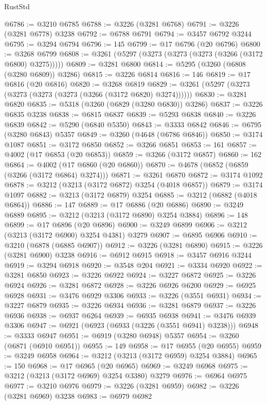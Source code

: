 \begin{lexlean}{RustStd}
\begin{coremodule}
{\begin{coremodule}
{{{{{{{{{{{{{{{{{{{{{{{{{{@6786 := @3210 @6785
@6788 := @3226 (@3281 @6768)
@6791 := @3226 (@3281 @6778) @3238
@6792 := @6788 @6791
@6794 := @3457 @6792 @3244
@6795 := @3294 @6794
@6796 := 145
@6799 := @17 @6796 (@20 @6796)
@6800 := @3268 @6799
@6808 := @3261 (@5297 (@3273 (@3273 (@3273 (@3266 (@3172 @6800) @3275)))))
@6809 := @3281 @6800
@6814 := @5295 (@3260 (@6808 (@3280 @6809)) @3286)
@6815 := @3226 @6814
@6816 := 146
@6819 := @17 @6816 (@20 @6816)
@6820 := @3268 @6819
@6829 := @3261 (@5297 (@3273 (@3273 (@3273 (@3273 (@3266 (@3172 @6820) @3274))))))
@6830 := @3281 @6820
@6835 := @5318 (@3260 (@6829 (@3280 @6830)) @3286)
@6837 := @3226 @6835 @3238
@6838 := @6815 @6837
@6839 := @5293 @6838
@6840 := @3226 @6839
@6842 := @5290 (@6840 @5350)
@6843 := @3333 @6842
@6846 := @6795 (@3280 @6843) @5357
@6849 := @3260 (@4648 (@6786 @6846))
@6850 := @3174 @1087
@6851 := @3172 @6850
@6852 := @3266 @6851
@6853 := 161
@6857 := @4002 (@17 @6853 (@20 @6853))
@6859 := @3266 (@3172 @6857)
@6860 := 162
@6864 := @4002 (@17 @6860 (@20 @6860))
@6870 := @4678 (@6852 (@6859 (@3266 (@3172 @6864) @3274)))
@6871 := @3261 @6870
@6872 := @3174 @1092
@6878 := @3212 (@3213 (@3172 @6872) @3254 (@4018 @6857))
@6879 := @3174 @1097
@6882 := @3213 (@3172 @6879) @3254
@6885 := @3212 (@6882 (@4018 @6864))
@6886 := 147
@6889 := @17 @6886 (@20 @6886)
@6890 := @3249 @6889
@6895 := @3212 (@3213 (@3172 @6890) @3254 @3884)
@6896 := 148
@6899 := @17 @6896 (@20 @6896)
@6900 := @3249 @6899
@6906 := @3212 (@3213 (@3172 @6900) @3254 @4381) @3279
@6907 := @6895 @6906
@6910 := @3210 (@6878 (@6885 @6907))
@6912 := @3226 (@3281 @6890)
@6915 := @3226 (@3281 @6900) @3238
@6916 := @6912 @6915
@6918 := @3457 @6916 @3244
@6919 := @3294 @6918
@6920 := @3548 @204
@6921 := @3334 @6920
@6922 := @3281 @6850
@6923 := @3226 @6922
@6924 := @3227 @6872
@6925 := @3226 @6924
@6926 := @3281 @6872
@6928 := @3226 @6926 @6200
@6929 := @6925 @6928
@6931 := @3476 @6929 @3306
@6933 := @3226 (@3551 @6931)
@6934 := @3227 @6879
@6935 := @3226 @6934
@6936 := @3281 @6879
@6937 := @3226 @6936
@6938 := @6937 @6264
@6939 := @6935 @6938
@6941 := @3476 @6939 @3306
@6947 := @6921 (@6923 (@6933 (@3226 (@3551 @6941) @3238)))
@6948 := @3333 @6947
@6951 := @6919 (@3280 @6948) @5357
@6954 := @3260 (@6871 (@6910 @6951))
@6955 := 149
@6958 := @17 @6955 (@20 @6955)
@6959 := @3249 @6958
@6964 := @3212 (@3213 (@3172 @6959) @3254 @3884)
@6965 := 150
@6968 := @17 @6965 (@20 @6965)
@6969 := @3249 @6968
@6975 := @3212 (@3213 (@3172 @6969) @3254 @3380) @3279
@6976 := @6964 @6975
@6977 := @3210 @6976
@6979 := @3226 (@3281 @6959)
@6982 := @3226 (@3281 @6969) @3238
@6983 := @6979 @6982
}}}}}}}}}}}}}}}}}}}}}}}}}}
\end{coremodule}}
\end{coremodule}
\end{lexlean}
